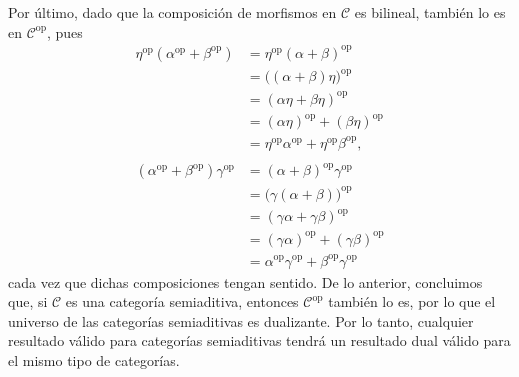 \documentclass[tesis]{subfiles}
\begin{document}
\begin{Obs}
    Por último, dado que la composición de morfismos en $\mathscr{C}$ es bilineal, también lo es en $\mathscr{C}^{\text{op}}$, pues
    \begin{align*}
        \eta^{\text{op}}(\alpha^{\text{op}}+\beta^{\text{op}}) &= \eta^{\text{op}}(\alpha+\beta)^{\text{op}} \\
                                                                 &= \big((\alpha+\beta)\eta\big)^{\text{op}} \\
                                                                 &= (\alpha\eta+\beta\eta)^{\text{op}} \\
                                                                 &= (\alpha\eta)^{\text{op}} + (\beta\eta)^{\text{op}} \\
                                                                 &= \eta^{\text{op}}\alpha^{\text{op}} + \eta^{\text{op}}\beta^{\text{op}}, \\ \\
                                                                 (\alpha^{\text{op}}+\beta^{\text{op}})\gamma^{\text{op}} &= (\alpha+\beta)^{\text{op}}\gamma^{\text{op}} \\
                                                                                                                          &= \big(\gamma(\alpha+\beta)\big)^{\text{op}} \\
                                                                                                                          &= (\gamma\alpha+\gamma\beta)^{\text{op}} \\
                                                                                                                          &= (\gamma\alpha)^{\text{op}} + (\gamma\beta)^{\text{op}} \\
                                                                                                                          &= \alpha^{\text{op}}\gamma^{\text{op}} + \beta^{\text{op}}\gamma^{\text{op}}
    \end{align*}
    cada vez que dichas composiciones tengan sentido. De lo anterior, concluimos que, si $\mathscr{C}$ es una categoría semiaditiva, entonces $\mathscr{C}^\text{op}$ también lo es, por lo que el universo de las categorías semiaditivas es dualizante. Por lo tanto, cualquier resultado válido para categorías semiaditivas tendrá un resultado dual válido para el mismo tipo de categorías.
\end{Obs}
\end{document}
